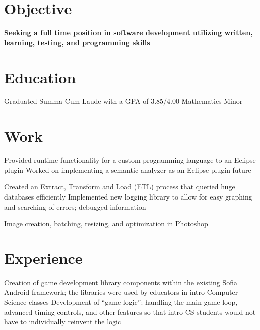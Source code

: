 \documentclass{my_cv}
\begin{document}

\section{Objective}
\workitemsone
{\textbf{Seeking a full time position in software development utilizing written, learning, testing, and programming skills}}

\section{Education}
\workitemstwo
{Graduated Summa Cum Laude with a GPA of 3.85/4.00 }
{Mathematics Minor}
 
\section{Work}
\workitemstwo
{Provided runtime functionality for a custom programming language to an Eclipse plugin}
{Worked on implementing a semantic analyzer as an Eclipse plugin future}

\workitemstwo
{Created an Extract, Transform and Load (ETL) process that queried huge databases efficiently  }
{Implemented new logging library to allow for easy graphing and searching of errors; debugged information}

\workitemsone
{Image creation, batching, resizing, and optimization in Photoshop}

\section{Experience}
\workitemstwo
{Creation of game development library components within the existing Sofia Android framework; the libraries were used by educators in intro Computer Science classes }
{Development of “game logic”: handling the main game loop, advanced timing controls, and other features so that intro CS students would not have to individually reinvent the logic}
\end{document}
